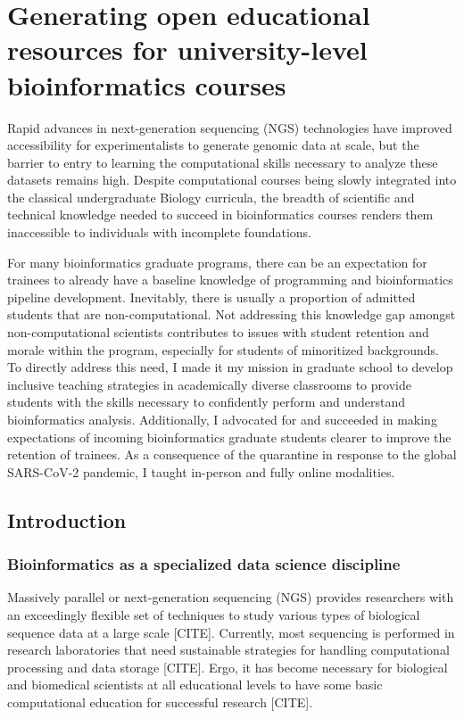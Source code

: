 \chapter{Generating open educational resources for university-level bioinformatics courses}

Rapid advances in next-generation sequencing (NGS) technologies have improved accessibility for experimentalists to generate genomic data at scale, but the barrier to entry to learning the computational skills necessary to analyze these datasets remains high. Despite computational courses being slowly integrated into the classical undergraduate Biology curricula, the breadth of scientific and technical knowledge needed to succeed in bioinformatics courses renders them inaccessible to individuals with incomplete foundations.

For many bioinformatics graduate programs, there can be an expectation for trainees to already have a baseline knowledge of programming and bioinformatics pipeline development. Inevitably, there is usually a proportion of admitted students that are non-computational. Not addressing this knowledge gap amongst non-computational scientists contributes to issues with student retention and morale within the program, especially for students of minoritized backgrounds. To directly address this need, I made it my mission in graduate school to develop inclusive teaching strategies in academically diverse classrooms to provide students with the skills necessary to confidently perform and understand bioinformatics analysis. Additionally, I advocated for and succeeded in making expectations of incoming bioinformatics graduate students clearer to improve the retention of trainees. As a consequence of the quarantine in response to the global SARS-CoV-2 pandemic, I taught in-person and fully online modalities. 

\section{Introduction}

\subsection{Bioinformatics as a specialized data science discipline}

Massively parallel or next-generation sequencing (NGS) provides researchers with an exceedingly flexible set of techniques to study various types of biological sequence data at a large scale [CITE]. Currently, most sequencing is performed in research laboratories that need sustainable strategies for handling computational processing and data storage [CITE]. Ergo, it has become necessary for biological and biomedical scientists at all educational levels to have some basic computational education for successful research [CITE]. 

